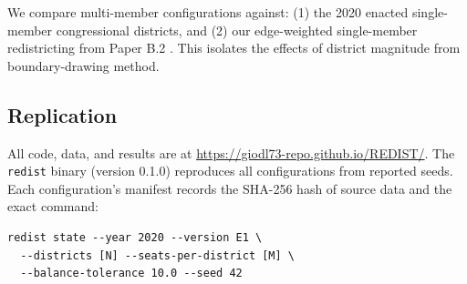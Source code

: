 We compare multi-member configurations against: (1) the 2020 enacted single-member congressional districts, and (2) our edge-weighted single-member redistricting from Paper B.2 \citep{dellib2026edgeweighted}. This isolates the effects of district magnitude from boundary-drawing method.

\subsection{Replication}

All code, data, and results are at \url{https://giodl73-repo.github.io/REDIST/}. The \texttt{redist} binary (version 0.1.0) reproduces all configurations from reported seeds. Each configuration's manifest records the SHA-256 hash of source data and the exact command:
\begin{verbatim}
redist state --year 2020 --version E1 \
  --districts [N] --seats-per-district [M] \
  --balance-tolerance 10.0 --seed 42
\end{verbatim}
